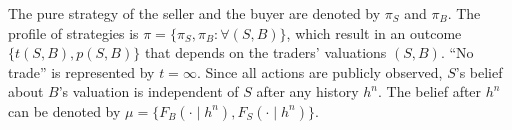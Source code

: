 \documentclass[11pt]{elegantbook_2}
\begin{document}
The pure strategy of the seller and the buyer are denoted by $\pi_S$ and $\pi_B$. The profile of strategies is $\pi=\{\pi_S,\pi_B:\forall (S,B)\}$, which result in an outcome $\{t(S,B),p(S,B)\}$ that depends on the traders' valuations $(S,B)$. ``No trade'' is represented by $t=\infty$. Since all actions are publicly observed, $S$'s belief about $B$'s valuation is independent of $S$ after any history $h^n$. The belief after $h^n$ can be denoted by $\mu=\{F_B(\cdot\mid h^n),F_S(\cdot\mid h^n)\}$.






























\end{document}
